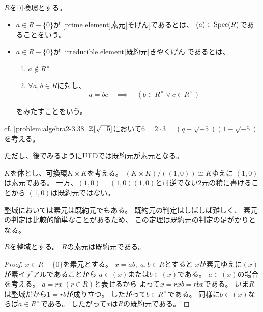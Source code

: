 \documentclass[report]{jlreq}
\begin{document}
\begin{definition}[素元と既約元]
    $R$を可換環とする。
    \begin{itemize}
        \item $a \in R - \{0\}$が
            [prime element]{素元}[そげん]であるとは、
            $(a) \in \mathrm{Spec}(R)$であることをいう。
        \item $a \in R - \{0\}$が
            [irreducible element]{既約元}[きやくげん]であるとは、
            \begin{enumerate}
                \item $a \not\in R^\times$
                \item $\forall a, b \in R$に対し、
                    \begin{equation}
                        a = bc
                        \quad \implies \quad
                        (b \in R^\times \lor c \in R^\times)
                    \end{equation}
            \end{enumerate}
            をみたすことをいう。
    \end{itemize}
\end{definition}

\begin{example}[既約元は素元とは限らない]
    cf. \cref{problem:algebra2-3.38}
    \TODO{}
    $\mathbb{Z}[\sqrt{-5}]$において$6 = 2 \cdot 3 = (q + \sqrt{-5})(1 - \sqrt{-5})$
    を考える。

    ただし、後でみるようにUFDでは既約元が素元となる。
\end{example}

\begin{example}[素元は既約元とは限らない]
    $K$を体とし、可換環$K \times K$を考える。
    $(K \times K) / ((1, 0)) \cong K$ゆえに
    $(1, 0)$は素元である。
    一方、$(1, 0) = (1, 0) (1, 0)$と可逆でない2元の積に書けることから
    $(1, 0)$は既約元ではない。
\end{example}

整域においては素元は既約元でもある。
既約元の判定はしばしば難しく、
素元の判定は比較的簡単なことがあるため、
この定理は既約元の判定の足がかりとなる。

\begin{theorem}[整域では素元は既約元]
    $R$を整域とする。
    $R$の素元は既約元である。
\end{theorem}

\begin{proof}
    $x \in R - \{ 0 \}$を素元とする。
    $x = ab, \; a, b \in R$とすると
    $x$が素元ゆえに$(x)$が素イデアルであることから
    $a \in (x)$または$b \in (x)$である。
    $a \in (x)$の場合を考える。
    $a = rx \; (r \in R)$と表せるから
    よって$x = rxb = rbx$である。
    いま$R$は整域だから$1 = rb$が成り立つ。
    したがって$b \in R^\times$である。
    同様に$b \in (x)$ならば$a \in R^\times$である。
    したがって$x$は$R$の既約元である。
\end{proof}
\end{document}
